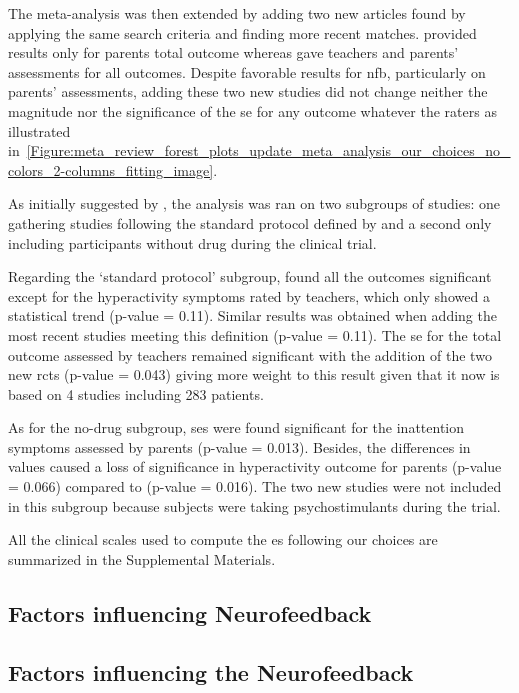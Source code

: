 The meta-analysis was then extended by adding two new articles \citep{Strehl2017, Baumeister2016} found 
by applying the same search criteria and finding more recent matches. \citet{Baumeister2016} provided results 
only for parents total outcome whereas \citet{Strehl2017} gave teachers and parents' assessments for all outcomes. 
Despite favorable results for \gls{nfb}, particularly on parents' assessments, adding these two new studies did not 
change neither the magnitude nor the significance of the \gls{se} for any outcome whatever the raters
as illustrated in~\ref{Figure:meta_review_forest_plots_update_meta_analysis_our_choices_no_colors_2-columns_fitting_image}. 
 
As initially suggested by \citeauthor{Cortese2016}, the analysis was ran on two subgroups of studies: one gathering 
studies following the standard protocol defined by \citet{Arns2014} and a second only including participants without 
drug during the clinical trial. 

Regarding the `standard protocol' subgroup, \citet{Cortese2016} found all the outcomes significant except for the 
hyperactivity symptoms rated by teachers, which only showed a statistical trend (p-value = 0.11). Similar results 
was obtained when adding the most recent studies meeting this definition \citep{Strehl2017} (p-value = 0.11). 
The \gls{se} for the total outcome assessed by teachers remained significant with the addition of the two new
\glspl{rct} (p-value = 0.043) giving more weight to this result given that it now is based on 4 studies including 283
patients.

As for the no-drug subgroup, \glspl{se} were found significant for the inattention symptoms assessed by parents (p-value = 0.013). 
Besides, the differences in \citet{Arnold2014} values caused a loss of significance in hyperactivity outcome for parents 
(p-value = 0.066) compared to \citet{Cortese2016} (p-value = 0.016). The two new studies were not included in this 
subgroup because subjects were taking psychostimulants during the trial.

All the clinical scales used to compute the \gls{es} following our choices are summarized in the Supplemental Materials.

\subsection{Factors influencing Neurofeedback}
\subsection{Factors influencing the Neurofeedback}


